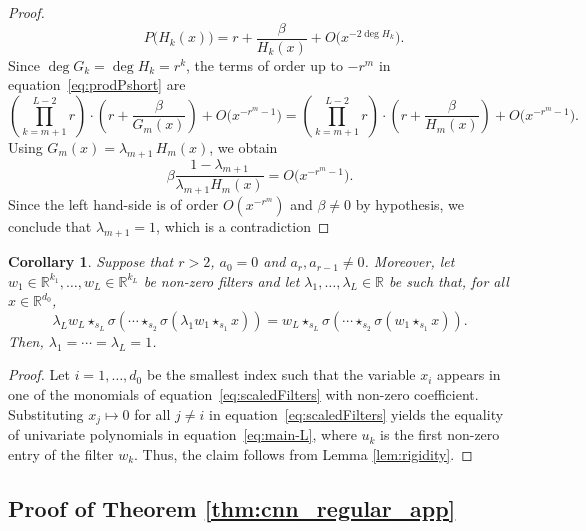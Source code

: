\documentclass{article} %
\def\eqref#1{equation~\ref{#1}}
\theoremstyle{plain}%
\newtheorem{cor}[thm]{Corollary}
\theoremstyle{definition}
\theoremstyle{remark}
\newcommand{\conv}[1]{\star_{#1}}
\begin{document}
\begin{proof}
\begin{equation}
      \qquad
      P\!\bigl(H_{k}(x)\bigr)=
      r+\frac{\beta}{H_{k}(x)}+O\!\bigl(x^{-2\deg H_{k}}\bigr).
\end{equation}
Since $\deg G_{k}=\deg H_{k}=r^{k}$, the terms of order up to $-r^m$ in \eqref{eq:prodPshort} are
\begin{equation}
    \left( \prod_{k=m+1}^{L-2} r \right) \cdot (r + \frac{\beta}{G_m(x)}) + O\!\bigl(x^{-r^{m}-1}\bigr)
    = \left( \prod_{k=m+1}^{L-2} r \right) \cdot (r + \frac{\beta}{H_m(x)}) + O\!\bigl(x^{-r^{m}-1}\bigr)
    .
\end{equation}
Using $G_{m}(x)=\lambda_{m+1}\,H_{m}(x)$, we obtain
\begin{equation}
   \beta \frac{1 -  \lambda_{m+1}}{\lambda_{m+1} H_m(x)} = O\!\bigl(x^{-r^{m}-1}\bigr).
\end{equation}
Since the left hand-side is of order $O(x^{-r^{m}})$ and $\beta \ne 0$ by hypothesis, we conclude that $\lambda_{m+1}=1$, which is a contradiction
\end{proof}

\begin{cor} \label{cor:scaledFilters}
    Suppose that $r > 2$, $a_0=0$ and  $a_r, a_{r-1} \not = 0$. 
Moreover, let $w_1 \in \mathbb{R}^{k_1}, \ldots, w_L \in \mathbb{R}^{k_L}$ be non-zero filters and let $\lambda_{1},\dots,\lambda_{L} \in \mathbb{R}$ be such that, for all $x \in \mathbb{R}^{d_0}$,
\begin{equation}\label{eq:scaledFilters} 
    \lambda_L w_{L} \conv{s_{L}} \sigma \left(\cdots \conv{s_2}  \sigma ( \lambda_1 w_1 \conv{s_1} x   ) \right)
    = 
   w_{L} \conv{s_{L}} \sigma \left(\cdots \conv{s_2}  \sigma ( w_1 \conv{s_1} x   ) \right).
\end{equation}
Then, $\lambda_1=\cdots=\lambda_L=1$.
\end{cor}
\begin{proof}
    Let $i = 1, \ldots, d_0$ be the smallest index such that the variable $x_i$ appears in one of the monomials of \eqref{eq:scaledFilters} with non-zero coefficient. 
    Substituting $x_j \mapsto 0$ for all $j \neq i$ in \eqref{eq:scaledFilters} yields the equality of univariate polynomials in \eqref{eq:main-L}, where $u_k$ is the first non-zero entry of the filter $w_k$. Thus, the claim follows from Lemma \ref{lem:rigidity}.
\end{proof}

\subsection{Proof of Theorem \ref{thm:cnn_regular_app}}\label{sec:proofcnnthm}
\end{document}
